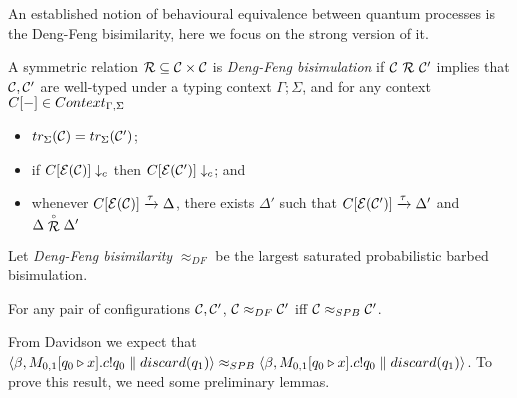 An established notion of behavioural equivalence between quantum processes is the Deng-Feng bisimilarity, here we focus on the strong version of it.
\begin{definition}
	A symmetric relation $\mathcal{R} \subseteq \mathcal{C} \times \mathcal{C}$ is \emph{Deng-Feng bisimulation} if $\mathcal{C}\ \mathcal{R}\ \mathcal{C}'$ implies that $\mathcal{C}, \mathcal{C}'$ are well-typed under a typing context $\Gamma; \Sigma$, and for any context $C[{-}] \in Context_{\Gamma, \Sigma}$
	\begin{itemize}
		\item $tr_{\Sigma}(\mathcal{C}) = tr_{\Sigma}(\mathcal{C}')$;
		\item if $C[\mathcal{E}(\mathcal{C})] \downarrow_{c}$ then $C[\mathcal{E}(\mathcal{C}')] \downarrow_{c}$; and
		\item whenever $C[\mathcal{E}(\mathcal{C})] \xrightarrow{\tau} \Delta$, there exists $\Delta'$ such that $C[\mathcal{E}(\mathcal{C}')] \xrightarrow{\tau} \Delta'$ and $\Delta \stackrel{\scriptscriptstyle \circ}{\mathcal{R}} \Delta'$
	\end{itemize}
	Let \emph{Deng-Feng bisimilarity} $\approx_{DF}$ be the largest saturated probabilistic barbed bisimulation.
\end{definition}

\begin{theorem}
	For any pair of configurations $\mathcal{C}, \mathcal{C}'$, $\mathcal{C} \approx_{DF} \mathcal{C}'$ iff $\mathcal{C} \approx_{SPB} \mathcal{C}'$.
\end{theorem}


From Davidson we expect that $\langle\beta, M_{0,1}[q_0 \triangleright x] . c ! q_0 \parallel discard(q_1)\rangle \approx_{SPB} \langle\beta, M_{0,1}[q_0 \triangleright x] . c ! q_0 \parallel discard(q_1)\rangle$. To prove this result, we need some preliminary lemmas.

\newcommand{\discQ}{disc(\widetilde{q})}
\newcommand{\trQ}{tr_{\widetilde{q}}}

